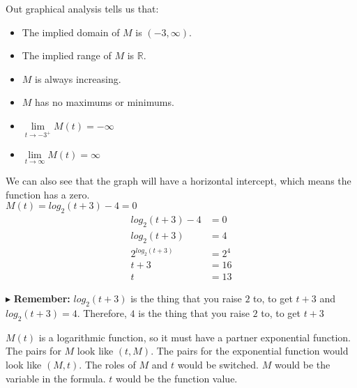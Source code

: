 \documentclass{ximera}
\begin{document}
\begin{example}
\begin{image}
\end{image}




Out graphical analysis tells us that:

\begin{itemize}
\item The implied domain of $M$ is $(-3,\infty)$.
\item The implied range of $M$ is $\mathbb{R}$.
\item $M$ is always increasing.
\item $M$ has no maximums or minimums.
\item $\lim\limits_{t \to -3^+} M(t) = -\infty$
\item $\lim\limits_{t \to \infty} M(t) = \infty$
\end{itemize}




We can also see that the graph will have a horizontal intercept, which means the function has a zero. \\


$M(t) = log_2(t+3) - 4 = 0$ \\


\begin{align*}
log_2(t+3) - 4 & = 0 \\
log_2(t+3) & = 4 \\
2^{log_2(t+3)} & = 2^4 \\
t+3 & = 16 \\
t & = 13
\end{align*}


$\blacktriangleright$ \textbf{Remember:} $log_2(t+3)$ is the thing that you raise $2$ to, to get $t+3$ and $log_2(t+3) = 4$.  Therefore, $4$ is the thing that you raise $2$ to, to get $t+3$











\end{example}



$M(t)$ is a logarithmic function, so it must have a partner exponential function.  The pairs for $M$ look like $(t, M)$. The pairs for the exponential function would look like $(M, t)$.  The roles of $M$ and $t$ would be switched. $M$ would be the variable in the formula. $t$ would be the function value.
\end{document}
